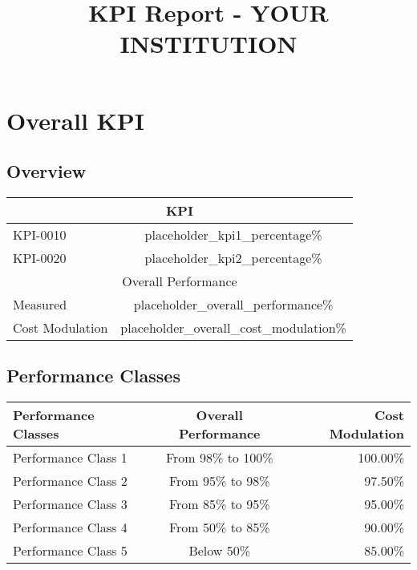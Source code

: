 \documentclass{article}
\begin{document}
\title{KPI Report - YOUR INSTITUTION\vspace{-1cm}}

\maketitle

\section{Overall KPI}

\subsection{Overview}

\begin{table}[H]
\centering
\begin{tabular}{|l|c|}
\hline
\multicolumn{2}{|c|}{\LARGE{KPI}} \\ \hline
KPI-0010 & placeholder_kpi1_percentage\% \\ \hline
KPI-0020 & placeholder_kpi2_percentage\% \\ \hline
\multicolumn{2}{|c|}{\large{Overall Performance}} \\ \hline
Measured & placeholder_overall_performance\% \\ \hline
Cost Modulation & placeholder_overall_cost_modulation\% \\ \hline
\end{tabular}
\end{table}

\subsection{Performance Classes}

\begin{table}[H]
\centering
\begin{tabular}{|l|c|r|}
\hline
\textbf{Performance Classes} & \textbf{Overall Performance} & \textbf{Cost Modulation} \\ \hline
Performance Class 1 & From 98\% to 100\% & 100.00\% \\ \hline
Performance Class 2 & From 95\% to 98\% & 97.50\% \\ \hline
Performance Class 3 & From 85\% to 95\% & 95.00\% \\ \hline
Performance Class 4 & From 50\% to 85\% & 90.00\% \\ \hline
Performance Class 5 & Below 50\% & 85.00\% \\ \hline
\end{tabular}
\end{table}
\end{document}
